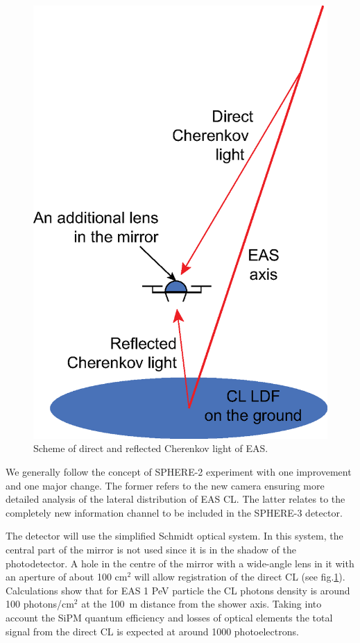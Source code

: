 \documentclass[a4paper,11pt]{article}
\begin{document}
\begin{figure}[t]
\centering %
\includegraphics[height=.35\textheight]{DirectCL.eps}
\caption{Scheme of direct and reflected Cherenkov light of EAS.}
\label{fig:DirectCL}
\end{figure}

We generally follow the concept of SPHERE-2 experiment with one improvement and one major change. The former refers to the new camera ensuring more detailed analysis of the lateral distribution of EAS CL. The latter relates to the completely new information channel to be included in the SPHERE-3 detector.

The detector will use the simplified Schmidt optical system. In this system, the central part of the mirror is not used since it is in the shadow of the photodetector. A hole in the centre of the mirror with a wide-angle lens in it with an aperture of about 100 cm$^2$ will allow registration of the direct CL (see fig.\ref{fig:DirectCL}). Calculations show that for EAS 1 PeV particle the CL photons density is around 100 photons/cm$^2$ at the 100~m distance from the shower axis. Taking into account the SiPM quantum efficiency and losses of optical elements the total signal from the direct CL is expected at around 1000 photoelectrons.
\end{document}
